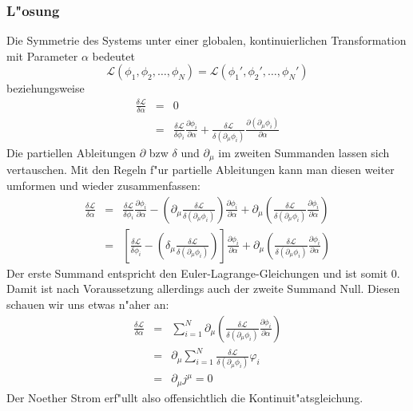 \documentclass[11pt,a4paper]{article}
\begin{document}
\subsubsection*{L"osung}
Die Symmetrie des Systems unter einer globalen, kontinuierlichen Transformation mit Parameter $\alpha$ bedeutet
\[\mathcal{L}(\phi_1, \phi_2, \ldots,\phi_N) = \mathcal{L}(\phi_1', \phi_2', \ldots,\phi_N')\]
beziehungsweise
\begin{eqnarray}
\frac{\delta\mathcal{L}}{\delta\alpha} & = & 0 \nonumber\\
& = & \frac{\delta\mathcal{L}}{\delta\phi_i}\frac{\partial\phi_i}{\partial\alpha} + \frac{\delta\mathcal{L}}{\delta(\partial_\mu\phi_i)}\frac{\partial(\partial_\mu\phi_i)}{\partial\alpha}
\end{eqnarray}
Die partiellen Ableitungen $\partial$ bzw $\delta$ und $\partial_\mu$ im zweiten Summanden lassen sich vertauschen. Mit den Regeln f"ur partielle Ableitungen kann man diesen weiter umformen und wieder zusammenfassen:
\begin{eqnarray}
\frac{\delta\mathcal{L}}{\delta\alpha} & = & \frac{\delta\mathcal{L}}{\delta\phi_i}\frac{\partial\phi_i}{\partial\alpha} - \left(\partial_\mu \frac{\delta\mathcal{L}}{\delta(\partial_\mu\phi_i)}\right)\frac{\partial\phi_i}{\partial\alpha} + \partial_\mu \left(\frac{\delta\mathcal{L}}{\delta(\partial_\mu\phi_i)}\frac{\partial\phi_i}{\partial\alpha} \right)\\
& = & \left[ \frac{\delta\mathcal{L}}{\delta\phi_i} - \left( \delta_\mu \frac{\delta\mathcal{L}}{\delta(\partial_\mu\phi_i)} \right)\right] \frac{\partial\phi_i}{\partial\alpha} + \partial_\mu \left(\frac{\delta\mathcal{L}}{\delta(\partial_\mu\phi_i)}\frac{\partial\phi_i}{\partial\alpha} \right)
\end{eqnarray}
Der erste Summand entspricht den Euler-Lagrange-Gleichungen und ist somit 0. Damit ist nach Voraussetzung allerdings auch der zweite Summand Null. Diesen schauen wir uns etwas n"aher an:
\begin{eqnarray}
\frac{\delta\mathcal{L}}{\delta\alpha} & = & \sum_{i=1}^N\partial_\mu \left(\frac{\delta\mathcal{L}}{\delta(\partial_\mu\phi_i)}\frac{\partial\phi_i}{\partial\alpha} \right)\nonumber\\ & = & \partial_\mu \sum_{i=1}^N \frac{\delta\mathcal{L}}{\delta(\partial_\mu\phi_i)}\varphi_i\nonumber\\ & = & \partial_\mu j^\mu = 0
\end{eqnarray}
Der Noether Strom erf"ullt also offensichtlich die Kontinuit"atsgleichung.\newpage
\end{document}
